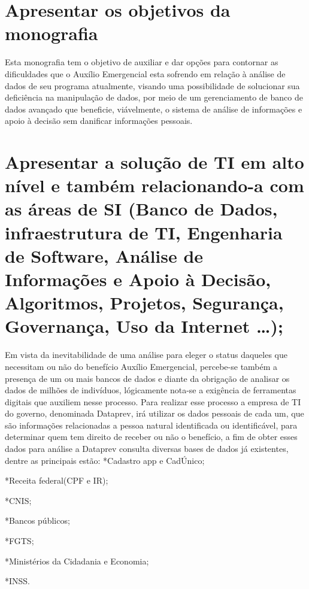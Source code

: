 \documentclass[12pt]{article}
\begin{document}
\section{Apresentar os objetivos da monografia}
	Esta monografia tem o objetivo de auxiliar e dar opções para contornar as dificuldades que o Auxílio Emergencial esta sofrendo em relação à análise de dados de seu programa atualmente, visando uma possibilidade de solucionar sua deficiência na manipulação de dados, por meio de um gerenciamento de banco de dados avançado que beneficie, viávelmente, o sistema de análise de informações e apoio à decisão sem danificar informações pessoais.

\section{Apresentar a solução de TI em alto nível e também relacionando-a com as áreas de SI (Banco de Dados, infraestrutura de TI, Engenharia de Software, Análise de Informações e Apoio à Decisão, Algoritmos, Projetos, Segurança, Governança, Uso da Internet …);}
	Em vista da inevitabilidade de uma análise para eleger o status daqueles que necessitam ou não do benefício Auxílio Emergencial, percebe-se também a presença de um ou mais bancos de dados e diante da obrigação de analisar os dados de milhões de indivíduos, lógicamente nota-se a exigência de ferramentas digitais que auxiliem nesse processo. Para realizar esse processo a empresa de TI do governo, denominada Dataprev, irá utilizar os dados pessoais de cada um, que são informações relacionadas a pessoa natural identificada ou identificável, para determinar quem tem direito de receber ou não o benefício, a fim de obter esses dados para análise a Dataprev consulta diversas bases de dados já existentes, dentre as principais estão:
*Cadastro app e CadÚnico;

*Receita federal(CPF e IR);

*CNIS;

*Bancos públicos; 

*FGTS;

*Ministérios da Cidadania e Economia; 

*INSS.
\end{document}
